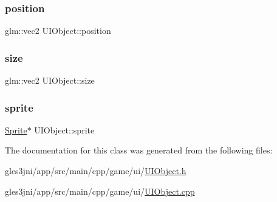 \subsubsection{\texorpdfstring{position}{position}}
{\footnotesize\ttfamily glm\+::vec2 U\+I\+Object\+::position\hspace{0.3cm}{\ttfamily [private]}}

\mbox{\label{class_u_i_object_a8aff4ab7d58367300405639712ade234}} 
\subsubsection{\texorpdfstring{size}{size}}
{\footnotesize\ttfamily glm\+::vec2 U\+I\+Object\+::size\hspace{0.3cm}{\ttfamily [private]}}

\mbox{\label{class_u_i_object_a20929a89f31c811f44de45e2116bfed3}} 
\subsubsection{\texorpdfstring{sprite}{sprite}}
{\footnotesize\ttfamily \hyperlink{class_sprite}{Sprite}$\ast$ U\+I\+Object\+::sprite\hspace{0.3cm}{\ttfamily [private]}}



The documentation for this class was generated from the following files\+:\begin{DoxyCompactItemize}
\item 
gles3jni/app/src/main/cpp/game/ui/\hyperlink{_u_i_object_8h}{U\+I\+Object.\+h}\item 
gles3jni/app/src/main/cpp/game/ui/\hyperlink{_u_i_object_8cpp}{U\+I\+Object.\+cpp}\end{DoxyCompactItemize}

